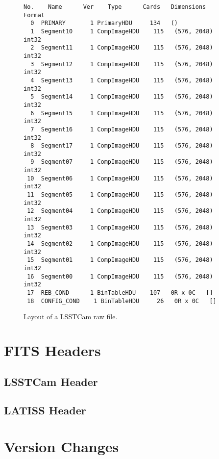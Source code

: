 \documentclass[OPS,lsstdraft,authoryear,toc]{lsstdoc}
\begin{document}
\begin{figure}
  \begin{center}
\begin{verbatim}
No.    Name      Ver    Type      Cards   Dimensions   Format
  0  PRIMARY       1 PrimaryHDU     134   ()
  1  Segment10     1 CompImageHDU    115   (576, 2048)   int32
  2  Segment11     1 CompImageHDU    115   (576, 2048)   int32
  3  Segment12     1 CompImageHDU    115   (576, 2048)   int32
  4  Segment13     1 CompImageHDU    115   (576, 2048)   int32
  5  Segment14     1 CompImageHDU    115   (576, 2048)   int32
  6  Segment15     1 CompImageHDU    115   (576, 2048)   int32
  7  Segment16     1 CompImageHDU    115   (576, 2048)   int32
  8  Segment17     1 CompImageHDU    115   (576, 2048)   int32
  9  Segment07     1 CompImageHDU    115   (576, 2048)   int32
 10  Segment06     1 CompImageHDU    115   (576, 2048)   int32
 11  Segment05     1 CompImageHDU    115   (576, 2048)   int32
 12  Segment04     1 CompImageHDU    115   (576, 2048)   int32
 13  Segment03     1 CompImageHDU    115   (576, 2048)   int32
 14  Segment02     1 CompImageHDU    115   (576, 2048)   int32
 15  Segment01     1 CompImageHDU    115   (576, 2048)   int32
 16  Segment00     1 CompImageHDU    115   (576, 2048)   int32
 17  REB_COND      1 BinTableHDU    107   0R x 0C   []
 18  CONFIG_COND    1 BinTableHDU     26   0R x 0C   []
\end{verbatim}
\end{center}
\caption{Layout of a LSSTCam raw file.}
\label{fig:layout}
\end{figure}

\section{FITS Headers}

\subsection{LSSTCam Header}



\subsection{LATISS Header}



\appendix

\section{Version Changes}
\end{document}
